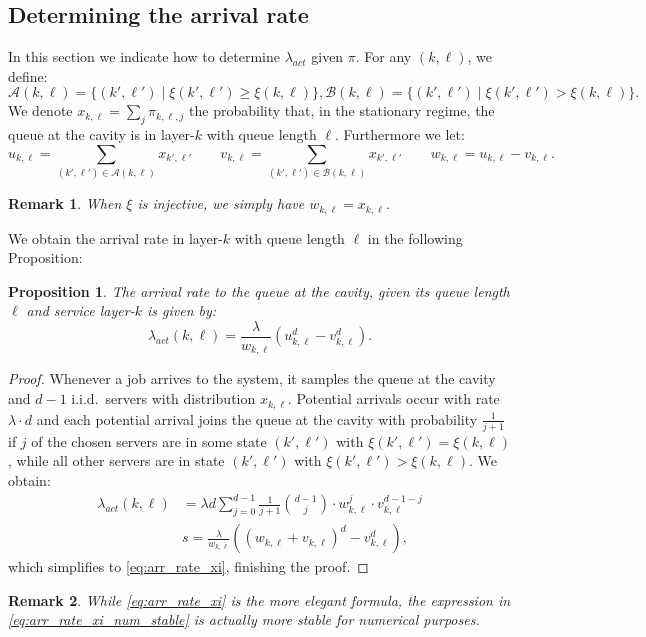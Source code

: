 \documentclass[12pt]{report}
\newtheorem{remark}{Remark}
\newtheorem{proposition}[theorem]{Proposition}
\begin{document}
\subsection{Determining the arrival rate} \label{sec:lambda}
In this section we indicate how to determine $\lambda_{act}$ given $\pi$.
For any $(k,\ell)$, we define:
\begin{equation}\label{eq:setAB}
\mathcal{A}(k,\ell) = \{(k', \ell') \mid \xi(k', \ell') \geq \xi(k,\ell) \}, \mathcal{B}(k,\ell) = \{(k', \ell') \mid \xi(k', \ell') > \xi(k,\ell)\}.
\end{equation}
We denote $x_{k, \ell} = \sum_{j} \pi_{k,\ell,j}$ the probability that, in the stationary regime, the queue at the cavity is in layer-$k$ with queue length $\ell$. Furthermore we let:
\begin{equation}\label{eq:uvw}
u_{k,\ell} = \sum_{(k',\ell') \in \mathcal{A}(k,\ell)} x_{k', \ell'} \qquad v_{k,\ell} = \sum_{(k', \ell') \in \mathcal{B}(k,\ell)} x_{k',\ell'} \qquad w_{k,\ell} = u_{k,\ell} - v_{k,\ell}.
\end{equation}
\begin{remark}
When $\xi$ is injective, we simply have $w_{k,\ell} = x_{k,\ell}$.
\end{remark}
 We obtain the arrival rate in layer-$k$ with queue length $\ell$ in the following Proposition:
\begin{proposition}\label{prop:arr_rate_xi}
The arrival rate to the queue at the cavity, given its queue length $\ell$ and service layer-$k$ is given by:
\begin{equation}\label{eq:arr_rate_xi}
\lambda_{act}(k,\ell) = \frac{\lambda}{w_{k,\ell}} \left( u_{k, \ell}^d - v_{k, \ell}^d \right).
\end{equation}
\end{proposition}
\begin{proof}
Whenever a job arrives to the system, it samples the queue at the cavity and $d-1$ i.i.d.~servers with distribution $x_{k,\ell}$. Potential arrivals occur with rate $\lambda \cdot d$ and each potential arrival joins the queue at the cavity with probability $\frac{1}{j+1}$ if $j$ of the chosen servers are in some state $(k', \ell')$ with $\xi(k',\ell') = \xi(k, \ell)$, while all other servers are in state $(k', \ell')$ with $\xi(k', \ell') > \xi(k,\ell)$. We obtain:
\begin{align}
\lambda_{act}(k, \ell)
&= \lambda d \sum_{j=0}^{d-1} \frac{1}{j+1} \binom{d-1}{j} \cdot w_{k, \ell}^j \cdot v_{k, \ell} ^{d-1-j}\label{eq:arr_rate_xi_num_stable}\\
&s= \frac{\lambda}{w_{k,\ell}}{((w_{k,\ell}+v_{k,\ell})^d - v_{k,\ell}^d)}, \nonumber
\end{align}
which simplifies to \eqref{eq:arr_rate_xi}, finishing the proof.
\end{proof}
\begin{remark}
While \eqref{eq:arr_rate_xi} is the more elegant formula, the expression in \eqref{eq:arr_rate_xi_num_stable} is actually more stable for numerical purposes. 
\end{remark}
\end{document}
